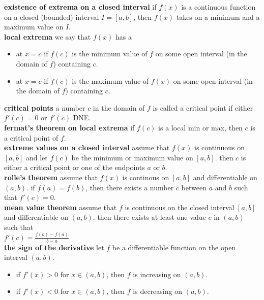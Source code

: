 \documentclass{article}
\begin{document}
\textbf{existence of extrema on a closed interval} if $f(x)$ is a continuous function on a closed (bounded) interval $I = [a, b]$, then $f(x)$ takes on a minimum and a maximum value on $I$.\\

\textbf{local extrema} we say that $f(x)$ has a
	\begin{itemize}
		\item at $x = c$ if $f(c)$ is the minimum value of $f$ on some open interval (in the domain of $f$) containing $c$.
		\item at $x = c$ if $f(c)$ is the maximum value of $f(x)$ on some open interval (in the domain of $f$) containing $c$.
	\end{itemize}

\textbf{critical points} a number $c$ in the domain of $f$ is called a critical point if either $f'(c) = 0$ or $f'(c)$ DNE.\\

\textbf{fermat's theorem on local extrema} if $f(c)$ is a local min or max, then $c$ is a critical point of $f$.\\

\textbf{extreme values on a closed interval} assume that $f(x)$ is continuous on $[a, b]$ and let $f(c)$ be the minimum or maximum value on $[a, b]$. then $c$ is either a critical point or one of the endpoints $a$ or $b$.\\

\textbf{rolle's theorem} assume that $f(x)$ is continous on $[a, b]$ and differentiable on $(a, b)$. if $f(a) = f(b)$, then there exists a number $c$ between $a$ and $b$ such that $f'(c) = 0$.\\

\textbf{mean value theorem} assume that $f$ is continuous on the closed interval $[a, b]$ and differentiable on $(a, b)$. then there exists at least one value $c$ in $(a, b)$ such that\\ $f'(c) = \frac{f(b) - f(a)}{b - a}$\\

\textbf{the sign of the derivative} let $f$ be a differentiable function on the open interval $(a, b)$.
	\begin{itemize}
		\item if $f'(x) > 0$ for $x \in (a, b)$, then $f$ is increasing on $(a, b)$.
		\item if $f'(x) < 0$ for $x \in (a, b)$, then $f$ is decreasing on $(a, b)$. 
	\end{itemize}
\end{document}

